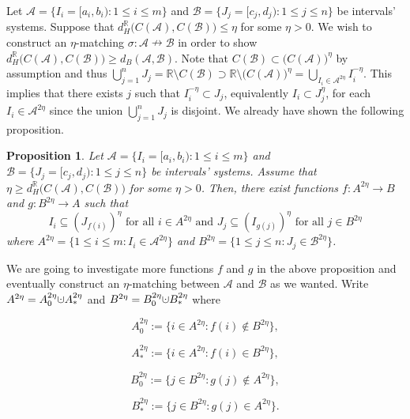 \documentclass[a4paper,12pt]{article}
\newtheorem{proposition}{Proposition}[section]
\newcommand{\dotcup}{\ensuremath{\mathaccent\cdot\cup}}
\begin{document}
Let $\mathcal{A}=\{I_i=[a_i,b_i):  1\leq i \leq m\}$ and $\mathcal{B}=\{J_j=[c_j,d_j): 1\leq j \leq n\}$ be intervals' systems. Suppose that $d_{H}^\mathbb{R}\big(C(\mathcal{A}) ,C(\mathcal{B})\big)\leq \eta$ for some $\eta>0$. We wish to construct an $\eta$-matching $\sigma:\mathcal{A}\nrightarrow \mathcal{B}$ in order to show  $d_{H}^\mathbb{R}\big(C(\mathcal{A}) ,C(\mathcal{B})\big)\geq d_B(\mathcal{A}, \mathcal{B})$. Note that $C(\mathcal{B})\subset \big(C(\mathcal{A})\big)^\eta$ by assumption and thus $\bigcup_{j=1}^nJ_j=\mathbb{R}\setminus C(\mathcal{B})\supset \mathbb{R}\setminus \big(C(\mathcal{A})\big)^\eta=\bigcup_{I_i\in \mathcal{A}^{2\eta}} I_i^{-\eta}$. This implies that there exists $j$ such that $I_i^{-\eta}\subset J_j$, equivalently $I_i\subset J_j^\eta$, for each $I_i\in \mathcal{A}^{2\eta}$ since the union $\bigcup_{j=1}^nJ_j$ is disjoint. We already have shown the following proposition.
\begin{proposition}
Let $\mathcal{A}=\{I_i=[a_i,b_i):  1\leq i \leq m\}$ and $\mathcal{B}=\{J_j=[c_j,d_j): 1\leq j \leq n\}$ be intervals' systems. Assume that $\eta\geq d_{H}^\mathbb{R}\big(C(\mathcal{A}),C(\mathcal{B})\big)$ for some $\eta>0$. Then, there exist functions $f:A^{2\eta}\rightarrow B$ and $g:B^{2\eta}\rightarrow A$ such that 
$$I_i \subseteq (J_{f(i)})^\eta\,\,\mbox{for all $i\in A^{2\eta}$ and } J_j \subseteq (I_{g(j)})^\eta\,\,\mbox{for all $j\in B^{2\eta}$}$$ where $A^{2\eta}=\{1\leq i \leq m: I_i\in \mathcal{A}^{2\eta}\}$ and $B^{2\eta}=\{1\leq j \leq n: J_j \in \mathcal{B}^{2\eta}\}$. 
\end{proposition}

We are going to investigate more functions $f$ and $g$ in the above proposition and eventually construct an $\eta$-matching between $\mathcal{A}$ and $\mathcal{B}$ as we wanted.
Write $A^{2\eta}=A^{2\eta}_0\dotcup A^{2\eta}_\ast$ and $B^{2\eta}=B^{2\eta}_0\dotcup B^{2\eta}_\ast$ where

$$A^{2\eta}_0:=\{i\in A^{2\eta}: f(i)\notin B^{2\eta}\},$$

$$A^{2\eta}_{*}:=\{i\in A^{2\eta}:f(i)\in B^{2\eta}\},$$

$$B_0^{2\eta}:=\{j\in B^{2\eta}:g(j)\notin A^{2\eta}\},$$

$$B^{2\eta}_\ast:=\{j\in B^{2\eta}:g(j)\in A^{2\eta}\}.$$
\end{document}
